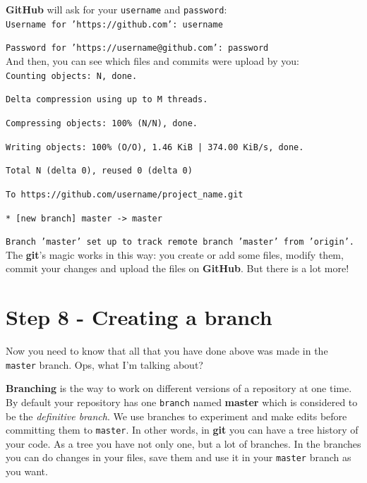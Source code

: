 \documentclass[12pt,a4paper,titlepage,brazil]{article}
\begin{document}
{{\bf GitHub} will ask for your \texttt{username} and  \texttt{password}:\\

\texttt{Username for 'https://github.com': username}

\texttt{Password for 'https://username@github.com': password}\\

And then, you can see which files and commits were upload by you:\\

\texttt{Counting objects: N, done.}
  
\texttt{Delta compression using up to M threads.}

\texttt{Compressing objects: 100\% (N/N), done.}

\texttt{Writing objects: 100\% (O/O), 1.46 KiB | 374.00 KiB/s, done.}

\texttt{Total N (delta 0), reused 0 (delta 0)}

\texttt{To https://github.com/username/project\_name.git}

\texttt{* [new branch]      master -> master}

\texttt{Branch 'master' set up to track remote branch 'master' from 'origin'.}\\

The {\bf git}'s magic works in this way: you create or add some files, modify them, commit your changes and upload the files on {\bf GitHub}. But there is a lot more!


\section{Step 8 - Creating a branch}

Now you need to know that all that you have done above was made in the \texttt{master} branch. Ops, what I'm talking about?

{\bf Branching} is the way to work on different versions of a repository at one time. By default your repository has one \texttt{branch} named {\bf master} which is considered to be the {\em definitive branch}. We use branches to experiment and make edits before committing them to \texttt{master}. In other words, in {\bf git} you can have a tree history of your code. As a tree you have not only one, but a lot of branches. In the branches you can do changes in your files, save them and use it in your \texttt{master} branch as you want.

}
\end{document}
